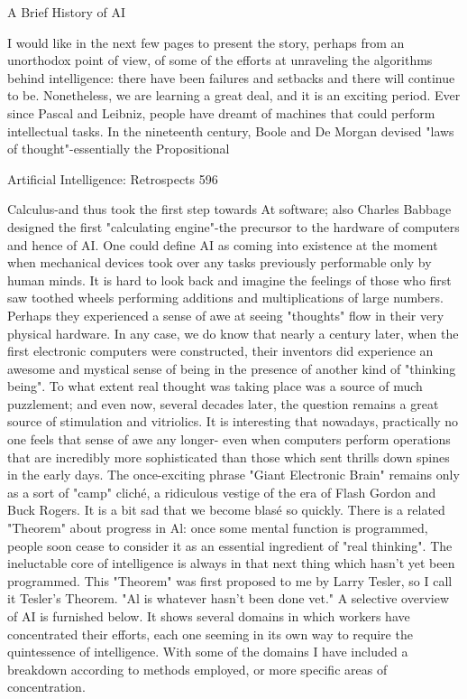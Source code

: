{                                 A Brief History of AI

I would like in the next few pages to present the story, perhaps from an unorthodox point
of view, of some of the efforts at unraveling the algorithms behind intelligence: there
have been failures and setbacks and there will continue to be. Nonetheless, we are
learning a great deal, and it is an exciting period.
   Ever since Pascal and Leibniz, people have dreamt of machines that could perform
intellectual tasks. In the nineteenth century, Boole and De Morgan devised "laws of
thought"-essentially the Propositional

Artificial Intelligence: Retrospects                                                     596

Calculus-and thus took the first step towards At software; also Charles Babbage designed
the first "calculating engine"-the precursor to the hardware of computers and hence of AI.
One could define AI as coming into existence at the moment when mechanical devices
took over any tasks previously performable only by human minds. It is hard to look back
and imagine the feelings of those who first saw toothed wheels performing additions and
multiplications of large numbers. Perhaps they experienced a sense of awe at seeing
"thoughts" flow in their very physical hardware. In any case, we do know that nearly a
century later, when the first electronic computers were constructed, their inventors did
experience an awesome and mystical sense of being in the presence of another kind of
"thinking being". To what extent real thought was taking place was a source of much
puzzlement; and even now, several decades later, the question remains a great source of
stimulation and vitriolics.
     It is interesting that nowadays, practically no one feels that sense of awe any longer-
even when computers perform operations that are incredibly more sophisticated than
those which sent thrills down spines in the early days. The once-exciting phrase "Giant
Electronic Brain" remains only as a sort of "camp" cliché, a ridiculous vestige of the era
of Flash Gordon and Buck Rogers. It is a bit sad that we become blasé so quickly.
     There is a related "Theorem" about progress in Al: once some mental function is
programmed, people soon cease to consider it as an essential ingredient of "real
thinking". The ineluctable core of intelligence is always in that next thing which hasn't
yet been programmed. This "Theorem" was first proposed to me by Larry Tesler, so I call
it Tesler's Theorem. "Al is whatever hasn't been done vet."
     A selective overview of AI is furnished below. It shows several domains in which
workers have concentrated their efforts, each one seeming in its own way to require the
quintessence of intelligence. With some of the domains I have included a breakdown
according to methods employed, or more specific areas of concentration.

}
